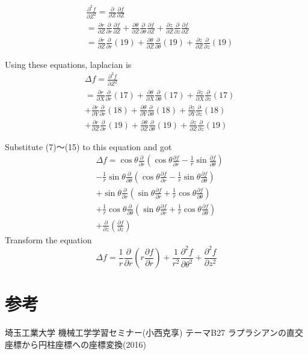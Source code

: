\documentclass[a4j,10pt]{jsarticle}
\begin{document}
\begin{eqnarray*}
&\frac{\partial^2 f}{\partial Z^2} =\frac{\partial}{\partial Z}\frac{\partial f}{\partial Z} \\
&=\frac{\partial r}{\partial Z}\frac{\partial}{\partial r}\frac{\partial f}{\partial Z} + \frac{\partial \theta}{\partial Z}\frac{\partial}{\partial \theta}\frac{\partial f}{\partial Z} + \frac{\partial z}{\partial Z}\frac{\partial}{\partial z}\frac{\partial f}{\partial Z} \\
&= \frac{\partial r}{\partial Z}\frac{\partial}{\partial r}(19) +\frac{\partial \theta}{\partial Z}\frac{\partial}{\partial \theta}(19) + \frac{\partial z}{\partial Z}\frac{\partial}{\partial z}(19)
\end{eqnarray*}

Using these equations, laplacian  is
\begin{eqnarray*}
&\Delta f = \frac{\partial^2 f}{\partial Z^2} \\ 
&= \frac{\partial r}{\partial X}\frac{\partial}{\partial r}(17) +\frac{\partial \theta}{\partial X}\frac{\partial}{\partial \theta}(17) + \frac{\partial z}{\partial X}\frac{\partial}{\partial z}(17) \\
& + \frac{\partial r}{\partial Y}\frac{\partial}{\partial r}(18) +\frac{\partial \theta}{\partial Y}\frac{\partial}{\partial \theta}(18) + \frac{\partial z}{\partial Y}\frac{\partial}{\partial z}(18) \\
&  + \frac{\partial r}{\partial Z}\frac{\partial}{\partial r}(19) +\frac{\partial \theta}{\partial Z}\frac{\partial}{\partial \theta}(19) + \frac{\partial z}{\partial Z}\frac{\partial}{\partial z}(19)
\end{eqnarray*}

Substitute (7)〜(15) to this equation and got 
\begin{eqnarray*}
&\Delta f = \cos \theta \frac{\partial}{\partial r} (\cos \theta \frac{\partial f}{\partial r} - \frac{1}{r}\sin \frac{\partial f}{\partial \theta})\\
&-\frac{1}{r}\sin\theta \frac{\partial}{\partial \theta} (\cos\theta \frac{\partial f}{\partial r} - \frac{1}{r}\sin\theta \frac{\partial f}{\partial \theta})\\
&+\sin \theta \frac{\partial}{\partial r} (\sin \theta \frac{\partial f}{\partial r} + \frac{1}{r}\cos \theta \frac{\partial f}{\partial \theta} )\\
&+\frac{1}{r}\cos \theta \frac{\partial}{\partial \theta} (\sin \theta \frac{\partial f}{\partial r} + \frac{1}{r}\cos\theta \frac{\partial f}{\partial \theta}) \\
&+ \frac{\partial}{\partial z} (\frac{\partial f}{\partial z})
\end{eqnarray*}
Transform the equation 
\begin{equation}
\Delta f = \frac{1}{r}\frac{\partial }{\partial r}(r \frac{\partial f}{\partial r})+\frac{1}{r^2}\frac{\partial ^2 f}{\partial \theta^2} + \frac{\partial ^2 f}{\partial z^2}
\end{equation}

\section{参考}
埼玉工業大学 機械工学学習セミナー(小西克享) テーマB27 ラプラシアンの直交座標から円柱座標への座標変換(2016)



\end{document}
